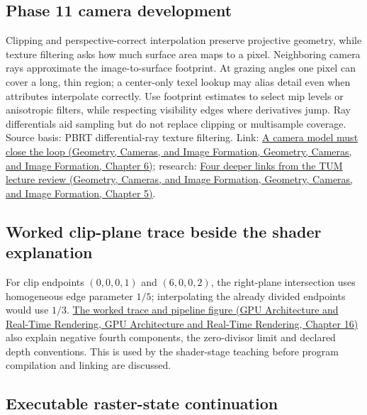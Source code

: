 \subsection{Phase 11 camera development}\label{appendix-40426e4b2103-phase-11-camera-development}

Clipping and perspective-correct interpolation preserve projective geometry, while texture filtering asks how much surface area maps to a pixel. Neighboring camera rays approximate the image-to-surface footprint. At grazing angles one pixel can cover a long, thin region; a center-only texel lookup may alias detail even when attributes interpolate correctly. Use footprint estimates to select mip levels or anisotropic filters, while respecting visibility edges where derivatives jump. Ray differentials aid sampling but do not replace clipping or multisample coverage. Source basis: PBRT differential-ray texture filtering. Link: \href{../03-Geometry-Cameras-and-Image-Formation/main.pdf\#nameddest=02-foundations-ii-ch037-a-camera-model-must-close-the-loop}{A camera model must close the loop (Geometry, Cameras, and Image Formation, Geometry, Cameras, and Image Formation, Chapter 6)}; research: \href{../03-Geometry-Cameras-and-Image-Formation/main.pdf\#nameddest=02-foundations-ii-ch036-four-deeper-links-from-the-tum-lecture-review}{Four deeper links from the TUM lecture review (Geometry, Cameras, and Image Formation, Geometry, Cameras, and Image Formation, Chapter 5)}.

\subsection{Worked clip-plane trace beside the shader explanation}\label{appendix-40426e4b2103-worked-clip-plane-trace-beside-the-shader-explanation}

For clip endpoints \((0,0,0,1)\) and \((6,0,0,2)\), the right-plane intersection uses homogeneous edge parameter \(1/5\); interpolating the already divided endpoints would use \(1/3\). \href{../06-GPU-Architecture-and-Real-Time-Rendering/main.pdf\#nameddest=06-engine-ii-ch025-clip-coordinates-are-not-normalized-device-coordinates}{The worked trace and pipeline figure (GPU Architecture and Real-Time Rendering, GPU Architecture and Real-Time Rendering, Chapter 16)} also explain negative fourth components, the zero-divisor limit and declared depth conventions. This is used by the shader-stage teaching before program compilation and linking are discussed.

\subsection{Executable raster-state continuation}\label{appendix-40426e4b2103-executable-raster-state-continuation}

